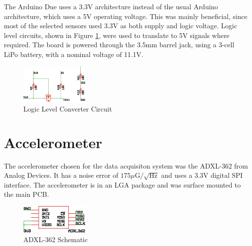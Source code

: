 The Arduino Due uses a 3.3V architecture instead of the usual Arduino architecture, which uses a 5V operating voltage. This was mainly beneficial, since most of the selected sensors used 3.3V as both supply and logic voltage. Logic level circuits, shown in Figure \ref{logicLevel}, were used to translate to 5V signals where required.  The board is powered through the 3.5mm barrel jack, using a 3-cell LiPo battery, with a nominal voltage of 11.1V.
\begin{figure}[H]

  \centering
    \includegraphics[width=0.3\textwidth]{figures/logicLevelConverterSchematic.eps}
      \caption{Logic Level Converter Circuit} \label{logicLevel}
\end{figure}

\section{Accelerometer}
The accelerometer chosen for the data acquisiton system was the ADXL-362 from Analog Devices. It has a noise error of $175\mu\text{G}/\sqrt{\text{Hz}}$ and uses a 3.3V digital SPI interface\cite{adxl362DataSheet}. The accelerometer is in an LGA package and was surface mounted to the main PCB.
\begin{figure}[H]

  \centering
    \includegraphics[width=0.3\textwidth]{figures/adxl362.eps}
      \caption{ADXL-362 Schematic} \label{adxl362Schematic}
\end{figure}

